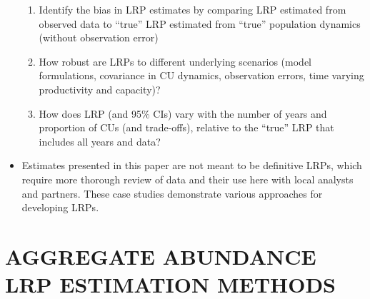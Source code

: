 \documentclass[11pt]{book}
\begin{document}
\begin{itemize}
\begin{enumerate}
  \item
    Identify the bias in LRP estimates by comparing LRP estimated from observed data to ``true'' LRP estimated from ``true'' population dynamics (without observation error)
  \item
    How robust are LRPs to different underlying scenarios (model formulations, covariance in CU dynamics, observation errors, time varying productivity and capacity)?
  \item
    How does LRP (and 95\% CIs) vary with the number of years and proportion of CUs (and trade-offs), relative to the ``true'' LRP that includes all years and data?
  \end{enumerate}
\item
  Estimates presented in this paper are not meant to be definitive LRPs, which require more thorough review of data and their use here with local analysts and partners. These case studies demonstrate various approaches for developing LRPs.
\end{itemize}
\hypertarget{aggregate-abundance-lrp-estimation-methods}{%
\section{AGGREGATE ABUNDANCE LRP ESTIMATION METHODS}\label{aggregate-abundance-lrp-estimation-methods}}
\end{document}
